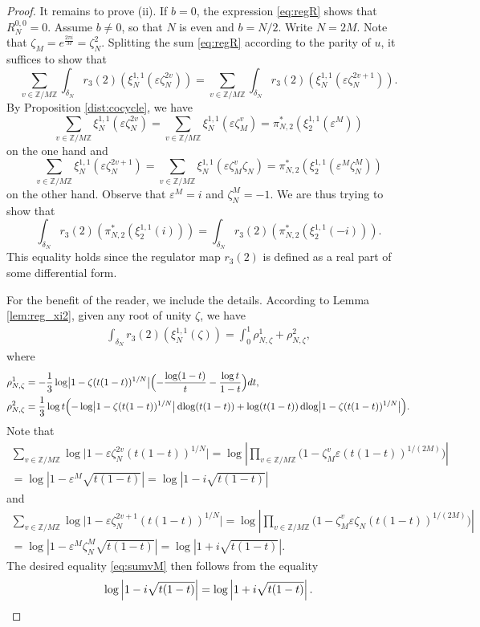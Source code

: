 \documentclass[11pt,a4,leqno]{amsart}
\theoremstyle{my theoremstyle}
\theoremstyle{dfn}
\theoremstyle{remark}
\renewcommand{\1}{\mathbbm{1}}
\newcommand{\Z}{\mathbb{Z}}
\newcommand{\e}{\varepsilon}
\newcommand{\z}{\zeta}
\numberwithin{equation}{section}
\newcommand{\dlog}{\operatorname{dlog}}
\begin{document}
\begin{proof}
    It remains to prove (ii). If $b=0$, the expression \eqref{eq:regR} shows that $R_N^{0,0}=0$. Assume $b \neq 0$, so that $N$ is even and $b=N/2$. Write $N=2M$. Note that $\z_{M}=e^{\frac{2\pi i}{M}}=\z_N^2$.
    Splitting the sum \eqref{eq:regR} according to the parity of $u$, it suffices to show that 
    \begin{equation}\label{eq:sumvM}
    \sum_{v\in \Z/M\Z} \int_{\delta_N} r_3(2)(\xi^{1,1}_N(\e \zeta_N^{2v}))=\sum_{v\in \Z/M\Z} \int_{\delta_N} r_3(2)(\xi^{1,1}_N(\e \zeta_N^{2v+1})).
    \end{equation}
    By Proposition \ref{dist:cocycle}, we have 
    \[
    \sum_{v\in \Z/M\Z} \xi_N^{1,1}(\e\z_N^{2v})=\sum_{v\in \Z/M\Z} \xi_N^{1,1}(\e\z_M^v)=\pi_{N,2}^*(\xi_{2}^{1,1}(\e^M))
    \]
    on the one hand and
    \[
    \sum_{v\in \Z/M\Z} \xi_N^{1,1}(\e\z_N^{2v+1})=\sum_{v\in \Z/M\Z} \xi_N^{1,1}(\e\z_M^v \z_N)=\pi_{N,2}^*(\xi_{2}^{1,1}(\e^M \z_N^M))
    \]
    on the other hand.
    Observe that $\e^M=i$ and $\z_N^M=-1$.
    We are thus trying to show that 
    \[
    \int_{\delta_N} r_3(2)(\pi_{N,2}^*(\xi_{2}^{1,1}(i)))=\int_{\delta_N} r_3(2)(\pi_{N,2}^*(\xi_{2}^{1,1}(-i))).
    \]
    This equality holds since the regulator map $r_3(2)$ is defined as a real part of some differential form. 
    
    For the benefit of the reader, we include the details. According to Lemma \ref{lem:reg_xi2}, given any root of unity $\z$, we have
    \begin{align*}
        \int_{\delta_N} r_3(2)(\xi_N^{1,1}(\zeta)) = \int_0^1 \rho_{N,\z}^1 + \rho_{N,\z}^2,
    \end{align*}
    where
    \begin{align*}
        \rho_{N,\z}^1 & = - \frac13 \log \bigl|1-\zeta (t(1-t))^{1/N}\bigr| \Bigl(-\frac{\log(1-t)}{t} - \frac{\log t}{1-t}\Bigr) dt, \\
        \rho_{N,\z}^2 & = \frac13 \log t \Bigl(-\log \bigl|1-\zeta (t(1-t))^{1/N}\bigr| \dlog(t(1-t)) + \log(t(1-t)) \dlog \bigl|1-\zeta (t(1-t))^{1/N}\bigr| \Bigr).
    \end{align*}
    Note that 
    \begin{multline*}
\sum_{v\in \Z/M\Z} \log \bigl|1-\e \zeta_N^{2v} (t(1-t))^{1/N}\bigr| = \log \left\vert \prod_{v\in \Z/M\Z} \Big( 1- \zeta_M^{v} \e(t(1-t))^{1/(2M)}\Big)  \right\vert \\  = \log \left\vert 1- \e^M \sqrt{t(1-t)}  \right\vert  = \log \left\vert 1- i \sqrt{t(1-t)}  \right\vert
\end{multline*}
and 
\begin{multline*}
\sum_{v\in \Z/M\Z} \log \bigl|1-\e \zeta_N^{2v+1} (t(1-t))^{1/N}\bigr| = \log \left\vert \prod_{v\in \Z/M\Z} \Big( 1- \zeta_M^{v} \e \z_N (t(1-t))^{1/(2M)}\Big)  \right\vert \\  = \log \left\vert 1- \e^M \z_N^M \sqrt{t(1-t)}  \right\vert  = \log \left\vert 1 + i \sqrt{t(1-t)}  \right\vert.
\end{multline*}
The desired equality \eqref{eq:sumvM} then follows from the equality
\[
\log \left\vert 1- i \sqrt{t(1-t)}  \right\vert = \log \left\vert 1 + i \sqrt{t(1-t)}  \right\vert. \qedhere
\]
\end{proof}
\end{document}
